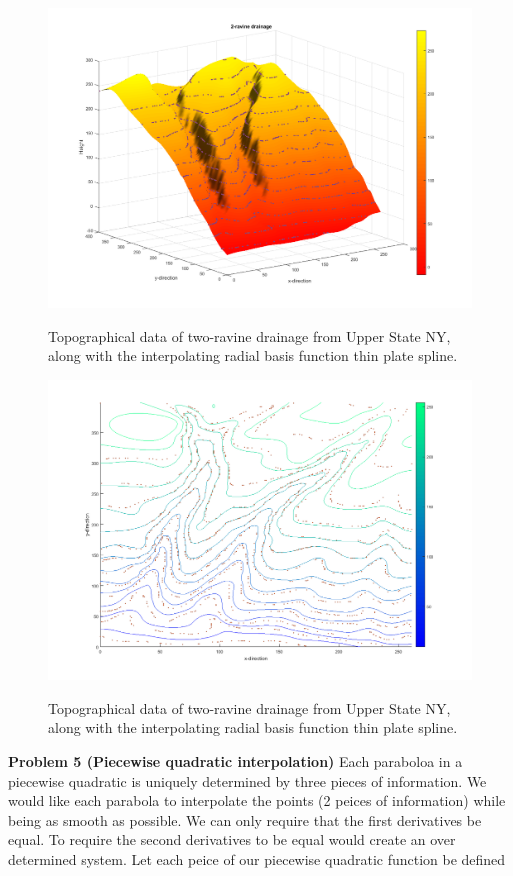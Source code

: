 \documentclass[12pt]{article}
\newcommand{\problem}[1]{\hspace{-4 ex} \large \textbf{Problem #1} }
\begin{document}
	\begin{figure}[h]
		\caption{Topographical data of two-ravine drainage from Upper State NY, along with the interpolating radial basis function thin plate spline.}
		\includegraphics[width=1.0\textwidth]{hw5_p4_fig1}
		\label{hw5_p4_fig1}
		\centering
	\end{figure}

	\begin{figure}[h]
		\caption{Topographical data of two-ravine drainage from Upper State NY, along with the interpolating radial basis function thin plate spline.}
		\includegraphics[width=1.0\textwidth]{hw5_p4_fig2}
		\label{hw5_p4_fig2}
		\centering
	\end{figure}

\problem{5 (Piecewise quadratic interpolation)} Each paraboloa in a piecewise quadratic is uniquely determined by three pieces of information. We would like each parabola to interpolate the points (2 peices of information) while being as smooth as possible. We can only require that the first derivatives be equal. To require the second derivatives to be equal would create an over determined system. Let each peice of our piecewise quadratic function be defined 
\end{document}
